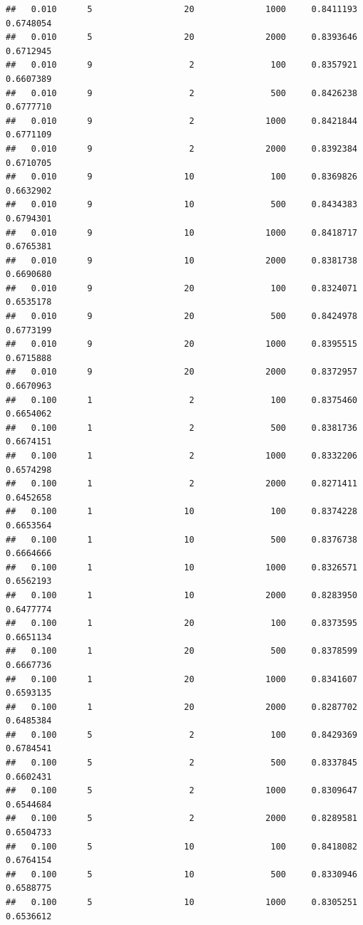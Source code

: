 \documentclass[]{article}
\begin{document}
\begin{lstlisting}
##   0.010      5                  20              1000     0.8411193  0.6748054
##   0.010      5                  20              2000     0.8393646  0.6712945
##   0.010      9                   2               100     0.8357921  0.6607389
##   0.010      9                   2               500     0.8426238  0.6777710
##   0.010      9                   2              1000     0.8421844  0.6771109
##   0.010      9                   2              2000     0.8392384  0.6710705
##   0.010      9                  10               100     0.8369826  0.6632902
##   0.010      9                  10               500     0.8434383  0.6794301
##   0.010      9                  10              1000     0.8418717  0.6765381
##   0.010      9                  10              2000     0.8381738  0.6690680
##   0.010      9                  20               100     0.8324071  0.6535178
##   0.010      9                  20               500     0.8424978  0.6773199
##   0.010      9                  20              1000     0.8395515  0.6715888
##   0.010      9                  20              2000     0.8372957  0.6670963
##   0.100      1                   2               100     0.8375460  0.6654062
##   0.100      1                   2               500     0.8381736  0.6674151
##   0.100      1                   2              1000     0.8332206  0.6574298
##   0.100      1                   2              2000     0.8271411  0.6452658
##   0.100      1                  10               100     0.8374228  0.6653564
##   0.100      1                  10               500     0.8376738  0.6664666
##   0.100      1                  10              1000     0.8326571  0.6562193
##   0.100      1                  10              2000     0.8283950  0.6477774
##   0.100      1                  20               100     0.8373595  0.6651134
##   0.100      1                  20               500     0.8378599  0.6667736
##   0.100      1                  20              1000     0.8341607  0.6593135
##   0.100      1                  20              2000     0.8287702  0.6485384
##   0.100      5                   2               100     0.8429369  0.6784541
##   0.100      5                   2               500     0.8337845  0.6602431
##   0.100      5                   2              1000     0.8309647  0.6544684
##   0.100      5                   2              2000     0.8289581  0.6504733
##   0.100      5                  10               100     0.8418082  0.6764154
##   0.100      5                  10               500     0.8330946  0.6588775
##   0.100      5                  10              1000     0.8305251  0.6536612

\end{lstlisting}
\end{document}

